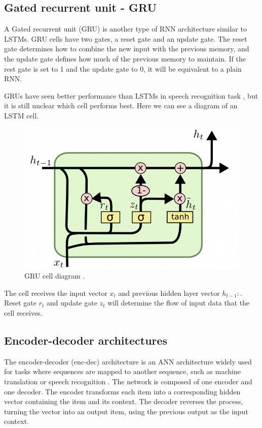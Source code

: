\documentclass{kththesis}
\begin{document}
\subsection{Gated recurrent unit - GRU}
A Gated recurrent unit (GRU) \cite{gru} is another type of RNN architecture similar to LSTMs. GRU cells have two gates, a reset gate \cite{gru-forget} and an update gate. The reset gate determines how to combine the new input with the previous memory, and the update gate defines how much of the previous memory to maintain. If the rest gate is set to 1 and the update gate to 0, it will be equivalent to a plain RNN.

GRUs have seen better performance than LSTMs in speech recognition task \cite{gru-speech}, but it is still unclear which cell performs best. Here we can see a diagram of an LSTM cell. 

\begin{figure}[H]
    \centering
    \includegraphics[scale=0.6]{images/background/GRU-core.png}
    \caption{GRU cell diagram \cite{daniel}.}
    
\end{figure}

The cell receives the input vector $x_{t}$ and previous hidden layer vector $h_{t-1}:$. Reset gate $r_t$ and update gate $z_t$ will determine the flow of input data that the cell receives.

\subsection{Encoder-decoder architectures}
The encoder-decoder (enc-dec) architecture is an ANN architecture widely used for tasks where sequences are mapped to another sequence, such as machine translation or speech recognition \cite{encoder-decoder}. The network is composed of one encoder and one decoder. The encoder transforms each item into a corresponding hidden vector containing the item and its context. The decoder reverses the process, turning the vector into an output item, using the previous output as the input context.
\end{document}
